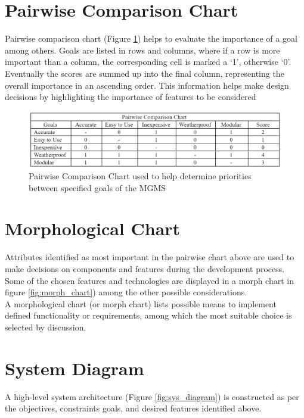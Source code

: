 \documentclass{report}
\begin{document}
\section{Pairwise Comparison Chart}
Pairwise comparison chart (Figure \ref{fig:pair_chart}) helps to evaluate the importance of a goal among others. Goals are listed in rows and columns, where if a row is more important than a column, the corresponding cell is marked a `1', otherwise `0'. Eventually the scores are summed up into the final column, representing the overall importance in an ascending order. This information helps make design decisions by highlighting the importance of features to be considered
\begin{figure}[H]
    \centering
    \includegraphics[width=\linewidth]{PNGs/PairwiseComparison.PNG}
    \caption{Pairwise Comparison Chart used to help determine priorities between specified goals of the MGMS}
    \label{fig:pair_chart}
\end{figure}

\section{Morphological Chart}
Attributes identified as most important in the pairwise chart above are used to make decisions on components and features during the development process. Some of the chosen features and technologies are displayed in a morph chart in figure \ref{fig:morph_chart}) among the other possible considerations.\\

A morphological chart (or morph chart) lists possible means to implement defined functionality or requirements, among which the most suitable choice is selected by discussion.

\section{System Diagram}
A high-level system architecture (Figure \ref{fig:sys_diagram}) is constructed as per the objectives, constraints goals, and desired features identified above.\\
\end{document}
